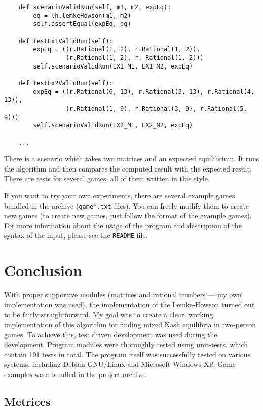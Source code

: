 \documentclass[a4paper,10pt]{article}
\begin{document}
\begin{verbatim}
    def scenarioValidRun(self, m1, m2, expEq):
        eq = lh.lemkeHowson(m1, m2)
        self.assertEqual(expEq, eq)

    def testEx1ValidRun(self):
        expEq = ((r.Rational(1, 2), r.Rational(1, 2)),
                 (r.Rational(1, 2), r. Rational(1, 2)))
        self.scenarioValidRun(EX1_M1, EX1_M2, expEq)

    def testEx2ValidRun(self):
        expEq = ((r.Rational(6, 13), r.Rational(3, 13), r.Rational(4, 13)),
                 (r.Rational(1, 9), r.Rational(3, 9), r.Rational(5, 9)))
        self.scenarioValidRun(EX2_M1, EX2_M2, expEq)

    ...
\end{verbatim}

There is a scenario which takes two matrices and an expected equilibrium. It
runs the algorithm and then compares the computed result with the expected
result. There are tests for several games, all of them written in this style.

If you want to try your own experiments, there are several example games
bundled in the archive (\texttt{game*.txt} files). You can freely modify them
to create new games (to create new games, just follow the format of the example
games). For more information about the usage of the program and description of
the syntax of the input, please see the \texttt{README} file.

\section{Conclusion}
\label{sec:Conclusion}

With proper supportive modules (matrices and rational numbers --- my own
implementation was used), the implementation of the Lemke-Howson turned out to
be fairly straightforward. My goal was to create a clear, working
implementation of this algorithm for finding mixed Nash equilibria in
two-person games. To achieve this, test driven development was used during the
development. Program modules were thoroughly tested using unit-tests, which
contain 191 tests in total. The program itself was successfully tested on
various systems, including Debian GNU/Linux and Microsoft Windows XP. Game
examples were bundled in the project archive.

\subsection*{Metrices}
\end{document}
